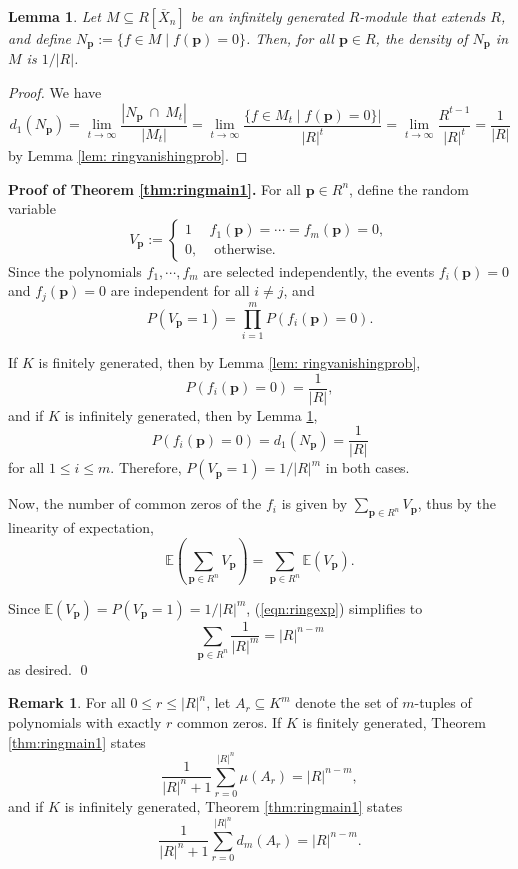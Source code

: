 \documentclass[12pt]{amsart}
\newtheorem{lemma}[theorem]{Lemma}
\theoremstyle{definition}
\newtheorem{remark}[theorem]{Remark}
\newcommand{\bp}{\mathbf{p} }
\begin{document}
\begin{lemma}\label{lem: ringvanishingprob2}
Let $M \subseteq R[\overline{X}_n]$ be an infinitely generated $R$-module that extends $R$, and define $N_{\mathbf{p}} := \{f \in M \mid f( \mathbf{p}) = 0 \}$. Then, for all $\mathbf{p} \in R$, the density of $N_{\mathbf{p}}$ in $M$ is $1/|R|$.
\end{lemma}

\begin{proof}
We have
\[
d_1(N_{\mathbf{p}}) = \lim_{t \to \infty}\frac{|N_{\mathbf{p}} \ \cap \ M_t|}{|M_t|} = \lim_{t \to \infty}\frac{\{f \in M_t \mid f( \mathbf{p}) = 0 \}|}{|R|^t} = \lim_{t \to \infty}\frac{R^{t-1}}{|R|^t} = \frac{1}{|R|}
\]
by Lemma \ref{lem: ringvanishingprob}.
\end{proof}

\noindent
\textbf{Proof of Theorem \ref{thm:ringmain1}.} 
For all $\bp \in R^n$, define the random variable
\[
    V_{\bp}  := \begin{cases}
        1 & f_1(\bp) = \cdots = f_m(\bp) = 0,\\
        0, & \text{ otherwise}.
    \end{cases}
\]
Since the polynomials $f_1, \cdots , f_m$ are selected independently, the events $f_i(\bp) = 0$ and $f_j(\bp) = 0$ are independent for all $i \ne j$, and
\[
P \left(V_{\bp} = 1 \right) = \prod_{i=1}^{m}P(f_i(\bp )=0).
\]

If $K$ is finitely generated, then by Lemma \ref{lem: ringvanishingprob},
\[
P(f_i(\bp )=0) = \frac{1}{|R|},
\]
and if $K$ is infinitely generated, then by Lemma \ref{lem: ringvanishingprob2},
\[
P(f_i(\bp )=0) = d_1(N_{\mathbf{p}}) = \frac{1}{|R|}
\]
for all $1 \le i \le m$. Therefore, $P \left(V_{\bp} = 1 \right) = 1/|R|^m$ in both cases.

Now, the number of common zeros of the $f_i$ is given by $\sum_{\bp \in R^n}V_{\bp}$, thus by the linearity of expectation, 
\begin{equation}\label{eqn:ringexp}
\mathbb{E} \left( \sum_{\bp \in R^n}V_{\bp} \right) = \sum_{\bp \in R^n}\mathbb{E}\left( V_{\bp} \right).   
\end{equation}

Since $\mathbb{E}\left( V_{\bp} \right) = P \left(V_{\bp} = 1 \right) = 1/|R|^m$, (\ref{eqn:ringexp}) simplifies to
\[
 \sum_{\bp \in R^n} \frac{1}{|R|^m} = |R|^{n-m}
\]
as desired. \qed

\begin{remark}
For all $0 \le r \le |R|^n$, let $A_r \subseteq K^m$ denote the set of $m$-tuples of polynomials with exactly $r$ common zeros. If $K$ is finitely generated, Theorem \ref{thm:ringmain1} states
\[
\frac{1}{|R|^n+1}\sum_{r=0}^{|R|^n}\mu(A_r) = |R|^{n-m},
\]
and if $K$ is infinitely generated, Theorem \ref{thm:ringmain1} states
\[
\frac{1}{|R|^n+1}\sum_{r=0}^{|R|^n}d_m(A_r) = |R|^{n-m}.
\]
\end{remark}
\end{document}
